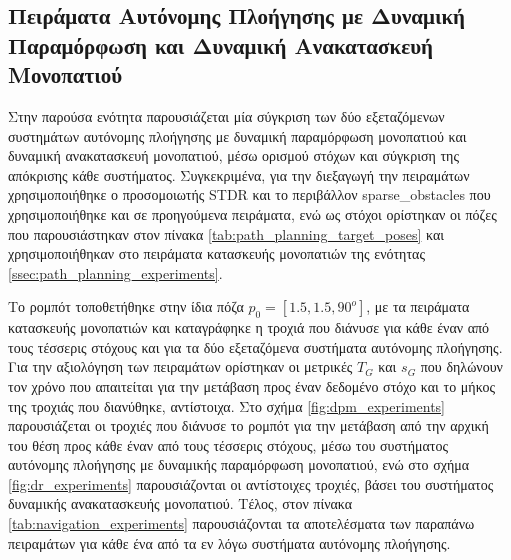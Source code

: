 \subsection{Πειράματα Αυτόνομης Πλοήγησης με Δυναμική Παραμόρφωση και Δυναμική Ανακατασκευή Μονοπατιού} \label{navigation_systems_comparison}
Στην παρούσα ενότητα παρουσιάζεται μία σύγκριση των δύο εξεταζόμενων συστημάτων αυτόνομης πλοήγησης με δυναμική παραμόρφωση μονοπατιού και δυναμική ανακατασκευή μονοπατιού, μέσω ορισμού στόχων και σύγκριση της απόκρισης κάθε συστήματος. Συγκεκριμένα, για την διεξαγωγή την πειραμάτων χρησιμοποιήθηκε ο προσομοιωτής STDR και το περιβάλλον sparse{\_}obstacles που χρησιμοποιήθηκε και σε προηγούμενα πειράματα, ενώ ως στόχοι ορίστηκαν οι πόζες που παρουσιάστηκαν στον πίνακα \ref{tab:path_planning_target_poses} και χρησιμοποιήθηκαν στο πειράματα κατασκευής μονοπατιών της ενότητας \ref{ssec:path_planning_experiments}.

\bigskip
Το ρομπότ τοποθετήθηκε στην ίδια πόζα $p_0=[1.5, 1.5, 90^o]$, με τα πειράματα κατασκευής μονοπατιών και καταγράφηκε η τροχιά που διάνυσε για κάθε έναν από τους τέσσερις στόχους και για τα δύο εξεταζόμενα συστήματα αυτόνομης πλοήγησης. Για την αξιολόγηση των πειραμάτων ορίστηκαν οι μετρικές $T_G$ και $s_G$ που δηλώνουν τον χρόνο που απαιτείται για την μετάβαση προς έναν δεδομένο στόχο και το μήκος της τροχιάς που διανύθηκε, αντίστοιχα. Στο σχήμα \ref{fig:dpm_experiments} παρουσιάζεται οι τροχιές που διάνυσε το ρομπότ για την μετάβαση από την αρχική του θέση προς κάθε έναν από τους τέσσερις στόχους, μέσω του συστήματος αυτόνομης πλοήγησης με δυναμικής παραμόρφωση μονοπατιού, ενώ στο σχήμα \ref{fig:dr_experiments} παρουσιάζονται οι αντίστοιχες τροχιές, βάσει του συστήματος δυναμικής ανακατασκευής μονοπατιού. Τέλος, στον πίνακα \ref{tab:navigation_experiments} παρουσιάζονται τα αποτελέσματα των παραπάνω πειραμάτων για κάθε ένα από τα εν λόγω συστήματα αυτόνομης πλοήγησης.

